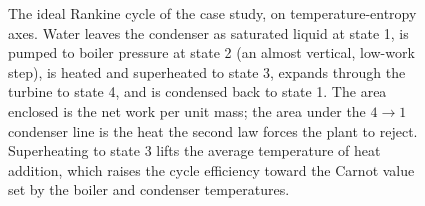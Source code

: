 \begin{figure}[htbp]
\caption[Ideal Rankine cycle on temperature-entropy axes]{The ideal Rankine
cycle of the case study, on temperature-entropy axes. Water leaves the
condenser as saturated liquid at state 1, is pumped to boiler pressure at
state 2 (an almost vertical, low-work step), is heated and superheated to
state 3, expands through the turbine to state 4, and is condensed back to
state 1. The area enclosed is the net work per unit mass; the area under the
$4\to1$ condenser line is the heat the second law forces the plant to reject.
Superheating to state 3 lifts the average temperature of heat addition, which
raises the cycle efficiency toward the Carnot value set by the boiler and
condenser temperatures.}
\label{fig:vol04ch01:rankine-ts}
\end{figure}
